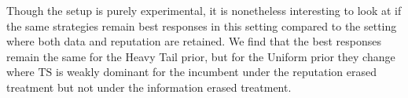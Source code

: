 \documentclass[letterpaper]{article}
\theoremstyle{definition}
\newcommand{\TS}{\mathrm{TS}}
\begin{document}
Though the setup is purely experimental, it is nonetheless interesting to look at if the same strategies remain best responses in this setting compared to the setting where both data and reputation are retained. We find that the best responses remain the same for the Heavy Tail prior, but for the Uniform prior they change where $\TS$ is weakly dominant for the incumbent under the reputation erased treatment but not under the information erased treatment.



\end{document}
